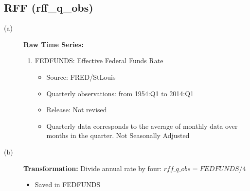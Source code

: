 \documentclass[3p,review,times]{elsarticle}		%
\begin{document}
\subsection{RFF (rff\_q\_obs)}
\begin{description}
	\item[(a)] \textbf{Raw Time Series:}
	\begin{enumerate}
		\item FEDFUNDS: Effective Federal Funds Rate
		\begin{itemize}
			\item Source: FRED/StLouis
			\item Quarterly observations: from 1954:Q1 to 2014:Q1
			\item Release: Not revised
			\item Quarterly data corresponds to the average of monthly data over months in the quarter. Not Seasonally Adjusted
		\end{itemize} 			
	\end{enumerate}
	\item[(b)] \textbf{Transformation:} Divide annual rate by four: $rff\_q\_obs=FEDFUNDS/4$
	\begin{itemize}
		\item Saved in FEDFUNDS
	\end{itemize}		
\end{description}
\end{document}

